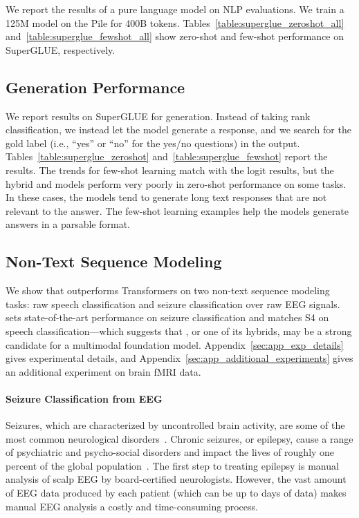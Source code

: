We report the results of a pure \hthree language model on NLP evaluations.
We train a 125M model on the Pile for 400B tokens.
Tables~\ref{table:superglue_zeroshot_all} and~\ref{table:superglue_fewshot_all} show zero-shot and few-shot performance on SuperGLUE, respectively.

\subsection{Generation Performance\label{sec:app_generation}}


We report results on SuperGLUE for generation.
Instead of taking rank classification, we instead let the model generate a response, and we search for the gold label (i.e., ``yes'' or ``no'' for the yes/no questions) in the output.
Tables~\ref{table:superglue_zeroshot} and~\ref{table:superglue_fewshot} report the results.
The trends for few-shot learning match with the logit results, but the hybrid and \hthree models perform very poorly in zero-shot performance on some tasks.
In these cases, the models tend to generate long text responses that are not relevant to the answer.
The few-shot learning examples help the models generate answers in a parsable format.

\subsection{Non-Text Sequence Modeling}
\label{subsec:non_text_sequence_modeling}

We show that \hthree outperforms Transformers on two non-text sequence modeling tasks: raw speech classification and seizure classification over raw EEG signals.
\hthree sets state-of-the-art performance on seizure classification and matches S4 on speech classification---which suggests that \hthree, or one of its hybrids, may be a strong candidate for a multimodal foundation model.
Appendix~\ref{sec:app_exp_details} gives experimental details, and Appendix~\ref{sec:app_additional_experiments} gives an additional experiment on brain fMRI data.

\paragraph{Seizure Classification from EEG}
Seizures, which are characterized by uncontrolled brain activity, are some of the most common neurological disorders~\citep{fisher2014ilae}. Chronic seizures, or epilepsy, cause a range of psychiatric and psycho-social disorders and impact the lives of roughly one percent of the global population~\citep{kerr2012impact}. The first step to treating epilepsy is manual analysis of scalp EEG by board-certified neurologists. However, the vast amount of EEG data produced by each patient (which can be up to days of data) makes manual EEG analysis a costly and time-consuming process.  

